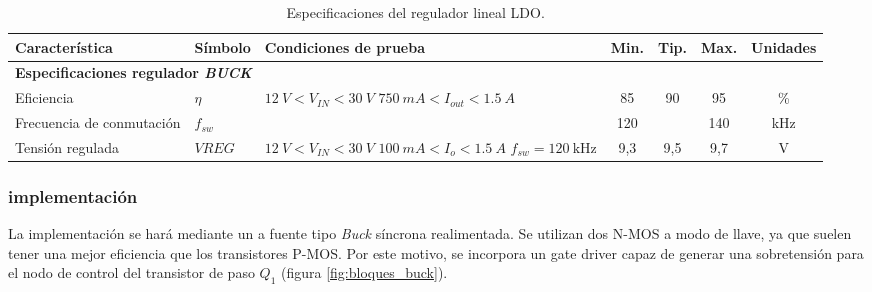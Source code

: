 \documentclass[]{article}
\begin{document}
		\begin{table}[H]
		\centering
		\renewcommand{\arraystretch}{1.5}
		\begin{tabular}{|p{3cm}|l|p{5cm}|c|c|c|c|}
			\hline
			\textbf{Característica} & \textbf{Símbolo} & \textbf{Condiciones de prueba} & \textbf{Min.} & \textbf{Tip.} & \textbf{Max.} & \textbf{Unidades} \\
			\hline
			
			\multicolumn{7}{|l|}{\textbf{Especificaciones regulador \textit{BUCK}}} \\
			\hline
			
			Eficiencia & $\eta$ & $\SI{12}{V} < V_{IN} < \SI{30}{V}$ \break $\SI{750}{mA} < I_{out} < \SI{1.5}{A}$ & 85 & 90 & 95 & \% \\
			\hline
			
			Frecuencia de conmutación & $f_{sw}$ &  & 120 &  & 140 & \si{\kilo\hertz} \\
			\hline
			
			Tensión regulada & $VREG$ & $\SI{12}{V} < V_{IN} < \SI{30}{V}$ \break $\SI{100}{mA} < I_o < \SI{1.5}{A}$ \break $f_{sw} = \SI{120}{\kilo\hertz}$ & 9,3 & 9,5  & 9,7 & \si{V} \\
			\hline
		\end{tabular}
		
		\caption{Especificaciones del regulador lineal LDO.}
		\label{tab:especificaciones_buck}
	\end{table}
	
	\subsubsection{implementación}
	
	La implementación se hará mediante un a fuente tipo \textit{Buck} síncrona realimentada. Se utilizan dos N-MOS a modo de llave, ya que suelen tener una mejor eficiencia que los transistores P-MOS. Por este motivo, se incorpora un gate driver capaz de generar una sobretensión para el nodo de control del transistor de paso $Q_1$ (figura \ref{fig:bloques_buck}).
	
\end{document}

